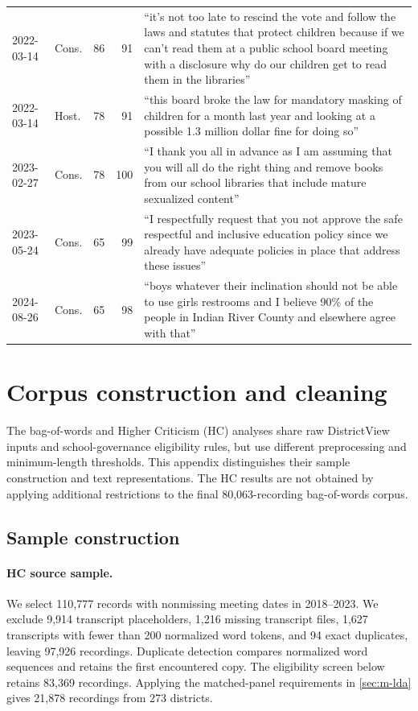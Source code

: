 \begin{table}[H]
\begin{tabularx}{\linewidth}{@{}l l r r X@{}}
2022-03-14 & Cons. & 86 & 91 & ``it's not too late to rescind the vote and follow the laws and statutes that protect children because if we can't read them at a public school board meeting with a disclosure why do our children get to read them in the libraries'' \\[2pt]
2022-03-14 & Host. & 78 & 91 & ``this board broke the law for mandatory masking of children for a month last year and looking at a possible 1.3 million dollar fine for doing so'' \\[2pt]
2023-02-27 & Cons. & 78 & 100 & ``I thank you all in advance as I am assuming that you will all do the right thing and remove books from our school libraries that include mature sexualized content'' \\[2pt]
2023-05-24 & Cons. & 65 & 99 & ``I respectfully request that you not approve the safe respectful and inclusive education policy since we already have adequate policies in place that address these issues'' \\[2pt]
2024-08-26 & Cons. & 65 & 98 & ``boys whatever their inclination should not be able to use girls restrooms and I believe 90\% of the people in Indian River County and elsewhere agree with that'' \\[2pt]
\bottomrule
\end{tabularx}
\end{table}

\section{Corpus construction and cleaning}\label{app:cleaning}

The bag-of-words and Higher Criticism (HC) analyses share raw
DistrictView inputs and school-governance eligibility rules,
but use different preprocessing and minimum-length thresholds.
This appendix distinguishes their sample construction and
text representations. The HC results are not obtained by
applying additional restrictions to the final 80,063-recording
bag-of-words corpus.

\subsection{Sample construction}

\paragraph{HC source sample.}
We select 110,777 records with nonmissing meeting dates in
2018--2023. We exclude 9,914 transcript placeholders,
1,216 missing transcript files, 1,627 transcripts with fewer
than 200 normalized word tokens, and 94 exact duplicates,
leaving 97,926 recordings. Duplicate detection compares
normalized word sequences and retains the first encountered
copy. The eligibility screen below retains 83,369 recordings.
Applying the matched-panel requirements in \cref{sec:m-lda}
gives 21,878 recordings from 273 districts.

